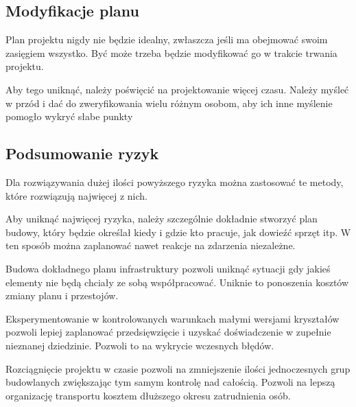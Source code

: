 \subsection{Modyfikacje planu}
Plan projektu nigdy nie będzie idealny, zwłaszcza jeśli ma obejmować swoim zasięgiem wszystko. Być może trzeba będzie modyfikować go w trakcie trwania projektu. 

Aby tego uniknąć, należy poświęcić na projektowanie więcej czasu. Należy myśleć w przód i dać do zweryfikowania wielu różnym osobom, aby ich inne myślenie pomogło wykryć słabe punkty

\subsection{Podsumowanie ryzyk}
Dla rozwiązywania dużej ilości powyższego ryzyka można zastosować te metody, które rozwiązują najwięcej z nich.

Aby uniknąć najwięcej ryzyka, należy szczególnie dokładnie stworzyć plan budowy, który będzie określał kiedy i gdzie kto pracuje, jak dowieźć sprzęt itp.
W ten sposób można zaplanować nawet reakcje na zdarzenia niezależne.

Budowa dokładnego planu infrastruktury pozwoli uniknąć sytuacji gdy jakieś elementy nie będą chciały ze sobą współpracować.
Uniknie to ponoszenia kosztów zmiany planu i przestojów.

Eksperymentowanie w kontrolowanych warunkach małymi wersjami kryształów pozwoli lepiej zaplanować przedsięwzięcie i uzyskać doświadczenie w zupełnie nieznanej dziedzinie.
Pozwoli to na wykrycie wczesnych błędów.

Rozciągnięcie projektu w czasie pozwoli na zmniejszenie ilości jednoczesnych grup budowlanych zwiększając tym samym kontrolę nad całością.
Pozwoli na lepszą organizację transportu kosztem dłuższego okresu zatrudnienia osób.